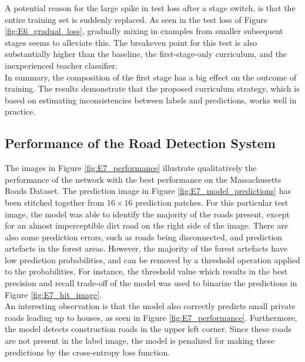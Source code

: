 A potential reason for the large spike in test loss after a stage switch, is that the entire training set is suddenly replaced. As seen in the test loss of Figure \ref{fig:E6_gradual_loss}, gradually mixing in examples from smaller subsequent stages seems to alleviate this. The breakeven point for this test is also substantially higher than the baseline, the first-stage-only curriculum, and the inexperienced teacher classifier.\\

In summary, the composition of the first stage has a big effect on the outcome of training. The results demonstrate that the proposed curriculum strategy, which is based on estimating inconsistencies between labels and predictions, works well in practice.

\subsection{Performance of the Road Detection System}
The images in Figure \ref{fig:E7_performance} illustrate qualitatively the performance of the network with the best performance on the Massachusetts Roads Dataset. The prediction image in Figure \ref{fig:E7_model_predictions} has been stitched together from $16 \times 16$ prediction patches. For this particular test image, the model was able to identify the majority of the roads present, except for an almost imperceptible dirt road on the right side of the image. There are also some prediction errors, such as roads being disconnected, and prediction artefacts in the forest areas. However, the majority of the forest artefacts have low prediction probabilities, and can be removed by a threshold operation applied to the probabilities. For instance, the threshold value which results in the best precision and recall trade-off of the model was used to binarize the predictions in Figure \ref{fig:E7_hit_image}.\\

An interesting observation is that the model also correctly predicts small private roads leading up to houses, as seen in Figure \ref{fig:E7_performance}. Furthermore, the model detects construction roads in the upper left corner. Since these roads are not present in the label image, the model is penalized for making these predictions by the cross-entropy loss function.\\


